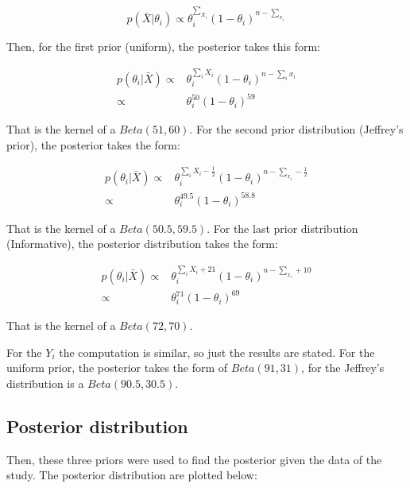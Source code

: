 \documentclass{article}
\begin{document}
\begin{equation}
	p(\bar{X}|\theta_i) \propto \theta_i^{\sum_{X_i}} (1- \theta_i)^{n-\sum_{x_i}}
\end{equation}

Then, for the first prior (uniform), the posterior takes this form:

\begin{equation}
\begin{split}
	p(\theta_i|\bar{X}) \propto& \theta_i^{\sum_i X_i} (1- \theta_i)^{n-\sum_i x_i}\\
	\propto& \theta_i^{50} (1- \theta_i)^{59}
\end{split}
\end{equation}

That is the kernel of a $Beta(51, 60)$. For the second prior distribution (Jeffrey's prior), the posterior takes the form:

\begin{equation}
\begin{split}
	p(\theta_i|\bar{X}) \propto& \theta_i^{\sum_i X_i-\frac{1}{2}} (1- \theta_i)^{n-\sum_{x_i}-\frac{1}{2}} \\
	\propto& \theta_i^{49.5} (1- \theta_i)^{58.8}
\end{split}
\end{equation}

That is the kernel of a $Beta(50.5, 59.5)$. For the last prior distribution (Informative), the posterior distribution takes the form:

\begin{equation}
\begin{split}
	p(\theta_i|\bar{X}) \propto& \theta_i^{\sum_i X_i+21} (1- \theta_i)^{n-\sum_{x_i}+10} \\
	\propto& \theta_i^{71} (1- \theta_i)^{69}
\end{split}
\end{equation}

That is the kernel of a $Beta(72, 70)$.


For the $Y_i$ the computation is similar, so just the results are stated. For the uniform prior, the posterior takes the form of $Beta(91, 31)$, for the Jeffrey's distribution is a $Beta(90.5, 30.5)$.

\newpage
\subsection{Posterior distribution}
Then, these three priors were used to find the posterior given the data of the study. The posterior distribution are plotted below:
\end{document}
